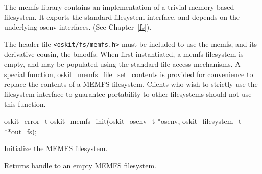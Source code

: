 %
% 
%
\label{memfs}

The memfs library contains an implementation of a trivial memory-based 
filesystem.  It exports the standard \oskit{} filesystem interface,
and depends on the underlying osenv interfaces.  (See
Chapter~\ref{fs}).

The header file \texttt{<oskit/fs/memfs.h>} must be included to use
the memfs, and its derivative cousin, the bmodfs.  When first
instantiated, a memfs filesystem is empty, and may be populated using
the standard file access mechanisms.  A special function,
oskit_memfs_file_set_contents is provided for convenience to replace
the contents of a MEMFS filesystem.  Clients who wish to strictly use
the \oskit{} filesystem interface to guarantee portability to other
filesystems should not use this function.


\begin{apisyn}

	\funcproto oskit_error_t oskit_memfs_init(oskit_osenv_t *osenv,
                                                  oskit_filesystem_t **out_fs);
\end{apisyn}
\begin{apidesc}
	Initialize the MEMFS filesystem.
\end{apidesc}
\begin{apiret}
	Returns handle to an empty MEMFS filesystem.
\end{apiret}

